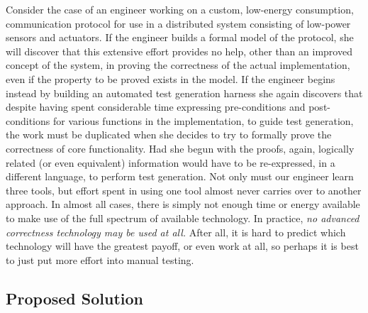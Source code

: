 Consider the case of an engineer working on a custom, low-energy consumption, communication protocol for use in a distributed system consisting of low-power sensors and actuators.  If the engineer builds a formal model of the protocol, she will discover that this extensive effort provides no help, other than an improved concept of the system, in proving the correctness of the actual implementation, even if the property to be proved exists in the model.  If the engineer begins instead by building an automated test generation harness she again discovers that despite having spent considerable time expressing pre-conditions and post-conditions for various functions in the implementation, to guide test generation, the work must be duplicated when she decides to try to formally prove the correctness of core functionality.  Had she begun with the proofs, again, logically related (or even equivalent) information would have to be re-expressed, in a different language, to perform test generation.  Not only must our engineer learn three tools, but effort spent in using one tool almost never carries over to another approach.  In almost all cases, there is simply not enough time or energy available to make use of the full spectrum of available technology.  In practice, \emph{no advanced correctness technology may be used at all.}  After all, it is hard to predict which technology will have the greatest payoff, or even work at all, so perhaps it is best to just put more effort into manual testing.

\subsection{Proposed Solution}

